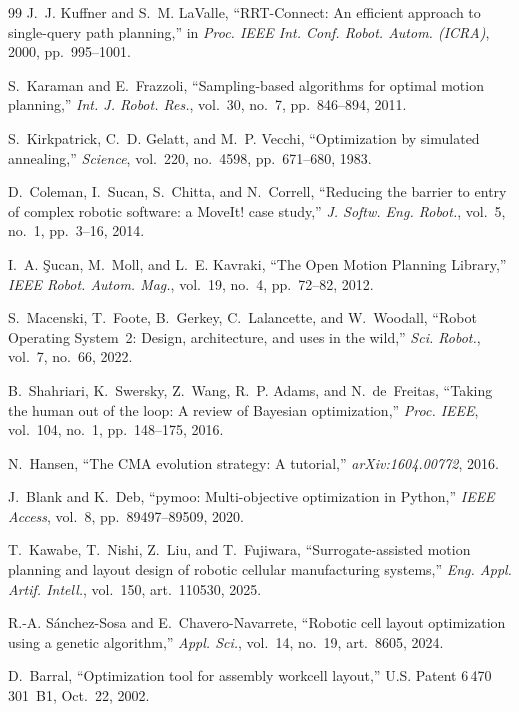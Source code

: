 \documentclass[conference]{IEEEtran}
\begin{document}
\begin{thebibliography}{99}
J.~J. Kuffner and S.~M. LaValle, ``RRT-Connect: An efficient approach to single-query path
planning,'' in \emph{Proc. IEEE Int. Conf. Robot. Autom. (ICRA)}, 2000, pp.~995--1001.

S.~Karaman and E.~Frazzoli, ``Sampling-based algorithms for optimal motion planning,''
\emph{Int. J. Robot. Res.}, vol.~30, no.~7, pp.~846--894, 2011.

S.~Kirkpatrick, C.~D. Gelatt, and M.~P. Vecchi, ``Optimization by simulated annealing,''
\emph{Science}, vol.~220, no.~4598, pp.~671--680, 1983.

D.~Coleman, I.~Sucan, S.~Chitta, and N.~Correll, ``Reducing the barrier to entry of complex
robotic software: a MoveIt! case study,'' \emph{J. Softw. Eng. Robot.}, vol.~5, no.~1,
pp.~3--16, 2014.

I.~A. \c{S}ucan, M.~Moll, and L.~E. Kavraki, ``The Open Motion Planning Library,''
\emph{IEEE Robot. Autom. Mag.}, vol.~19, no.~4, pp.~72--82, 2012.

S.~Macenski, T.~Foote, B.~Gerkey, C.~Lalancette, and W.~Woodall, ``Robot Operating System~2:
Design, architecture, and uses in the wild,'' \emph{Sci. Robot.}, vol.~7, no.~66, 2022.

B.~Shahriari, K.~Swersky, Z.~Wang, R.~P. Adams, and N.~de~Freitas, ``Taking the human out of the
loop: A review of Bayesian optimization,'' \emph{Proc. IEEE}, vol.~104, no.~1, pp.~148--175, 2016.

N.~Hansen, ``The CMA evolution strategy: A tutorial,'' \emph{arXiv:1604.00772}, 2016.

J.~Blank and K.~Deb, ``pymoo: Multi-objective optimization in Python,'' \emph{IEEE Access},
vol.~8, pp.~89497--89509, 2020.

T.~Kawabe, T.~Nishi, Z.~Liu, and T.~Fujiwara, ``Surrogate-assisted motion planning and layout
design of robotic cellular manufacturing systems,'' \emph{Eng. Appl. Artif. Intell.}, vol.~150,
art.~110530, 2025.

R.-A. S\'anchez-Sosa and E.~Chavero-Navarrete, ``Robotic cell layout optimization using a genetic
algorithm,'' \emph{Appl. Sci.}, vol.~14, no.~19, art.~8605, 2024.

D.~Barral, ``Optimization tool for assembly workcell layout,'' U.S. Patent 6\,470\,301~B1,
Oct.~22, 2002.


\end{thebibliography}
\end{document}
